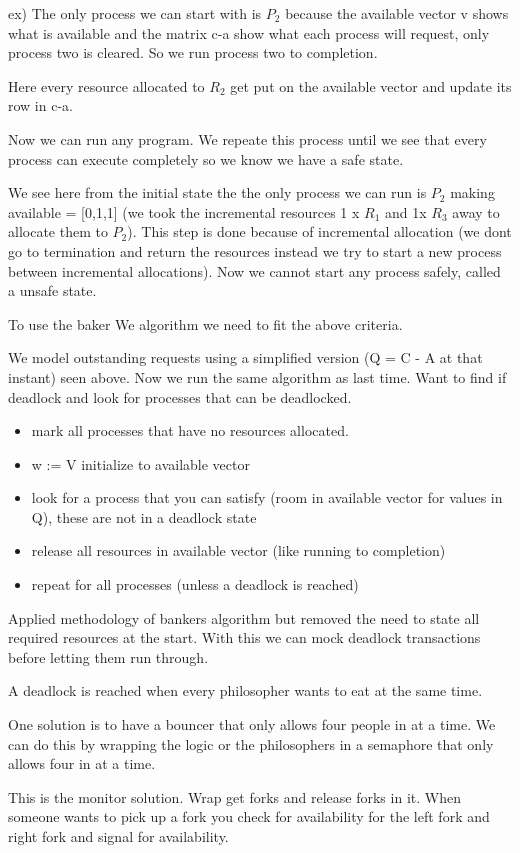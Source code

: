 \documentclass[24pt]{article}
\begin{document}
ex) The only process we can start with is $P_2$ because the available vector v shows what is available and the matrix c-a show what each process will request, only process two is cleared. So we run process two to completion.

Here every resource allocated to $R_2$ get put on the available vector and update its row in c-a.

Now we can run any program. We repeate this process until we see that every process can execute completely so we know we have a safe state.



We see here from the initial state the the only process we can run is $P_2$ making available = [0,1,1] (we took the incremental resources 1 x $R_1$ and 1x $R_3$ away to allocate them to $P_2$). This step is done because of incremental allocation (we dont go to termination and return the resources instead we try to start a new process between incremental allocations). Now we cannot start any process safely, called a unsafe state.



To use the baker We algorithm we need to fit the above criteria.

We model outstanding requests using a simplified version (Q = C - A at that instant) seen above. Now we run the same algorithm as last time. Want to find if deadlock and look for processes that can be deadlocked.

\begin{itemize}
    \item mark all processes that have no resources allocated.
    \item w := V  initialize to available vector
    \item look for a process that you can satisfy (room in available vector for values in Q), these are not in a deadlock state
    \item release all resources in available vector (like running to completion)
    \item repeat for all processes (unless a deadlock is reached)
\end{itemize}
Applied methodology of bankers algorithm but removed the need to state all required resources at the start. With this we can mock deadlock transactions before letting them run through.




A deadlock is reached when every philosopher wants to eat at the same time.


One solution is to have a bouncer that only allows four people in at a time. We can do this by wrapping the logic or the philosophers in a semaphore that only allows four in at a time.

This is the monitor solution. Wrap get forks and release forks in it. When someone wants to pick up a fork you check for availability for the left fork and right fork and signal for availability.




\end{document}
